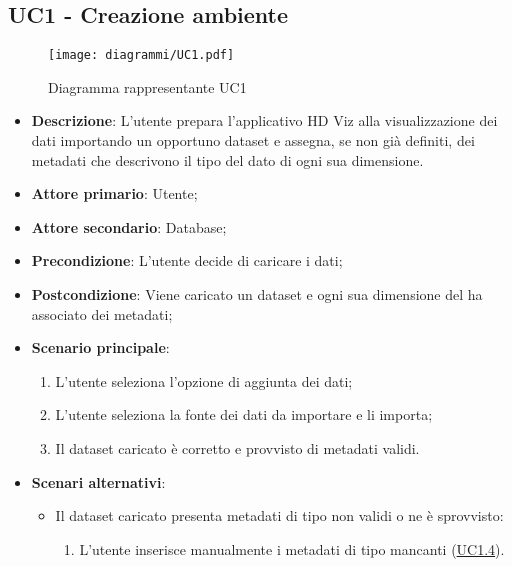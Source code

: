 \subsection{UC1 - Creazione ambiente}
\label{sub:uc1}


\begin{figure}[h]
    \centering
    \texttt{[image: diagrammi/UC1.pdf]}
    \caption{Diagramma rappresentante UC1}
    \label{fig:UC1}
\end{figure}


\begin{itemize}
    \item \textbf{Descrizione}: L'utente prepara l'applicativo HD Viz alla visualizzazione dei dati importando un opportuno dataset e assegna, se non già definiti, dei metadati che descrivono il tipo del dato di ogni sua dimensione.
	
    \item \textbf{Attore primario}: Utente;
    \item \textbf{Attore secondario}: Database;
    
    
    \item \textbf{Precondizione}:   L'utente decide di caricare i dati;

    \item \textbf{Postcondizione}:  Viene caricato un dataset e ogni sua dimensione del ha associato
                                    dei metadati;

	\item \textbf{Scenario principale}:
		\begin{enumerate}
			\item L'utente seleziona l'opzione di aggiunta dei dati;
            \item L'utente seleziona la fonte dei dati da importare e li importa;
            \item Il dataset caricato è corretto e provvisto di metadati validi.
        \end{enumerate}
   
    \item \textbf{Scenari alternativi}:
		\begin{itemize}
            \item Il dataset caricato presenta metadati di tipo non validi o ne è sprovvisto:
            \begin{enumerate}
                \item L'utente inserisce manualmente i metadati di tipo mancanti (\hyperref[ssub:uc1.4]{UC1.4}).
            \end{enumerate}
        \end{itemize}
\end{itemize}

